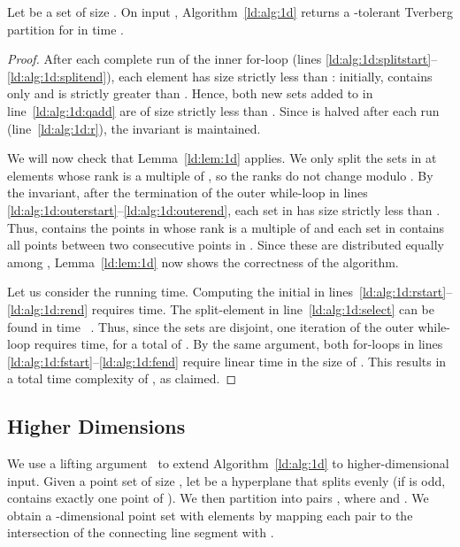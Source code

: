 \documentclass[oribibl,envcountsame,envcountsect]{llncs}
\begin{document}
\begin{theorem}
  Let  be a set of size . On input ,
  Algorithm~\ref{ld:alg:1d} returns a -tolerant Tverberg partition for  in
  time .
  \label{ld:thm:bound}
\end{theorem}
\begin{proof}
  After each complete run of the inner
  for-loop (lines \ref{ld:alg:1d:splitstart}--\ref{ld:alg:1d:splitend}),
  each element  has size strictly less than
  :
  initially,  contains only  and  is strictly greater than .
  Hence, both new sets added to  in line~\ref{ld:alg:1d:qadd}
  are of size strictly less than .
  Since  is halved after each run (line~\ref{ld:alg:1d:r}), the invariant is maintained.

  We will now check that Lemma~\ref{ld:lem:1d} applies. We only split the sets
  in  at elements whose rank is a multiple of , so the ranks do not change
  modulo . By the invariant, after the termination of the outer while-loop
  in lines \ref{ld:alg:1d:outerstart}--\ref{ld:alg:1d:outerend}, each set in 
  has size strictly less than . Thus,  contains the
  points in  whose rank is a multiple of  and
  each set  in  contains all points between two consecutive
  points in . Since these are distributed equally among
  , Lemma~\ref{ld:lem:1d} now shows the correctness of the
  algorithm.

  Let us consider the running time. Computing the initial  in
  lines~\ref{ld:alg:1d:rstart}--\ref{ld:alg:1d:rend} requires
   time. The split-element in
  line~\ref{ld:alg:1d:select} can be found in time
  ~\cite{Cormen2009}. Thus, since the sets are disjoint,
  one iteration of the outer while-loop requires  time, for a total of
  . By the same argument, both for-loops
  in lines \ref{ld:alg:1d:fstart}--\ref{ld:alg:1d:fend} require linear time in
  the size of . This results in a total time complexity of ,
  as claimed.
\end{proof}

\subsection{Higher Dimensions}
We use a lifting argument~\cite{Mulzer2013} to extend Algorithm~\ref{ld:alg:1d} to
higher-dimensional input.
Given a point set  of size , let  be a hyperplane that
splits  evenly (if  is odd,  contains exactly one point of ). We
then partition  into  pairs , where
 and . We obtain a -dimensional point set
with  elements by mapping each pair to the intersection of
the connecting line segment with .
\end{document}
